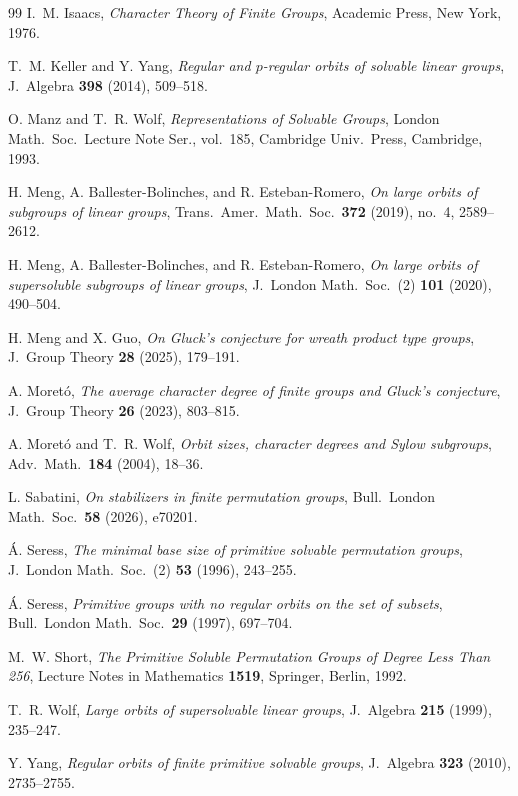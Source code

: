 \documentclass[10pt]{amsart}
\theoremstyle{definition}
\numberwithin{equation}{section}
\numberwithin{table}{section}
\begin{document}
\begin{thebibliography}{99}
I.~M. Isaacs,
{\it Character Theory of Finite Groups},
Academic Press, New York, 1976.

T.~M. Keller and Y. Yang,
{\it Regular and $p$-regular orbits of solvable linear groups},
J.\ Algebra \textbf{398} (2014), 509--518.

O. Manz and T.~R. Wolf,
{\it Representations of Solvable Groups},
London Math.\ Soc.\ Lecture Note Ser., vol.~185, Cambridge Univ.\ Press, Cambridge, 1993.

H. Meng, A. Ballester-Bolinches, and R. Esteban-Romero,
{\it On large orbits of subgroups of linear groups},
Trans.\ Amer.\ Math.\ Soc.\ \textbf{372} (2019), no.~4, 2589--2612.

H. Meng, A. Ballester-Bolinches, and R. Esteban-Romero,
{\it On large orbits of supersoluble subgroups of linear groups},
J.\ London Math.\ Soc.\ (2) \textbf{101} (2020), 490--504.

H. Meng and X. Guo,
{\it On Gluck's conjecture for wreath product type groups},
J.\ Group Theory \textbf{28} (2025), 179--191.

A. Moret\'o,
{\it The average character degree of finite groups and Gluck's conjecture},
J.\ Group Theory \textbf{26} (2023), 803--815.

A. Moret\'o and T.~R. Wolf,
{\it Orbit sizes, character degrees and Sylow subgroups},
Adv.\ Math.\ \textbf{184} (2004), 18--36.

L. Sabatini,
{\it On stabilizers in finite permutation groups},
Bull.\ London Math.\ Soc.\ \textbf{58} (2026), e70201.

\'A. Seress,
{\it The minimal base size of primitive solvable permutation groups},
J.\ London Math.\ Soc.\ (2) \textbf{53} (1996), 243--255.

\'A. Seress,
{\it Primitive groups with no regular orbits on the set of subsets},
Bull.\ London Math.\ Soc.\ \textbf{29} (1997), 697--704.

M.~W. Short,
{\it The Primitive Soluble Permutation Groups of Degree Less Than 256},
Lecture Notes in Mathematics \textbf{1519}, Springer, Berlin, 1992.

T.~R. Wolf,
{\it Large orbits of supersolvable linear groups},
J.\ Algebra \textbf{215} (1999), 235--247.

Y. Yang,
{\it Regular orbits of finite primitive solvable groups},
J.\ Algebra \textbf{323} (2010), 2735--2755.


\end{thebibliography}
\end{document}
